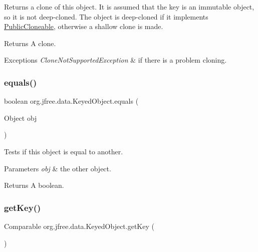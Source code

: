 Returns a clone of this object. It is assumed that the key is an immutable object, so it is not deep-\/cloned. The object is deep-\/cloned if it implements \mbox{\hyperlink{}{Public\+Cloneable}}, otherwise a shallow clone is made.

\begin{DoxyReturn}{Returns}
A clone.
\end{DoxyReturn}

\begin{DoxyExceptions}{Exceptions}
{\em Clone\+Not\+Supported\+Exception} & if there is a problem cloning. \\
\hline
\end{DoxyExceptions}
\mbox{\label{classorg_1_1jfree_1_1data_1_1_keyed_object_a5fa44f8434da1f2393d777f9e65e77b0}} 
\subsubsection{\texorpdfstring{equals()}{equals()}}
{\footnotesize\ttfamily boolean org.\+jfree.\+data.\+Keyed\+Object.\+equals (\begin{DoxyParamCaption}\item[{Object}]{obj }\end{DoxyParamCaption})}

Tests if this object is equal to another.


\begin{DoxyParams}{Parameters}
{\em obj} & the other object.\\
\hline
\end{DoxyParams}
\begin{DoxyReturn}{Returns}
A boolean. 
\end{DoxyReturn}
\mbox{\label{classorg_1_1jfree_1_1data_1_1_keyed_object_af96241323eb2253798fe035426d26bf5}} 
\subsubsection{\texorpdfstring{get\+Key()}{getKey()}}
{\footnotesize\ttfamily Comparable org.\+jfree.\+data.\+Keyed\+Object.\+get\+Key (\begin{DoxyParamCaption}{ }\end{DoxyParamCaption})}


